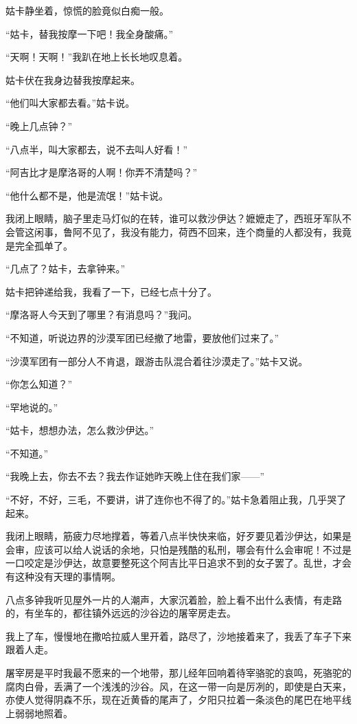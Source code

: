\par 姑卡静坐着，惊慌的脸竟似白痴一般。
\par “姑卡，替我按摩一下吧！我全身酸痛。”
\par “天啊！天啊！”我趴在地上长长地叹息着。
\par 姑卡伏在我身边替我按摩起来。
\par “他们叫大家都去看。”姑卡说。
\par “晚上几点钟？”
\par “八点半，叫大家都去，说不去叫人好看！”
\par “阿吉比才是摩洛哥的人啊！你弄不清楚吗？”
\par “他什么都不是，他是流氓！”姑卡说。
\par 我闭上眼睛，脑子里走马灯似的在转，谁可以救沙伊达？嬷嬷走了，西班牙军队不会管这闲事，鲁阿不见了，我没有能力，荷西不回来，连个商量的人都没有，我竟是完全孤单了。
\par “几点了？姑卡，去拿钟来。”
\par 姑卡把钟递给我，我看了一下，已经七点十分了。
\par “摩洛哥人今天到了哪里？有消息吗？”我问。
\par “不知道，听说边界的沙漠军团已经撤了地雷，要放他们过来了。”
\par “沙漠军团有一部分人不肯退，跟游击队混合着往沙漠走了。”姑卡又说。
\par “你怎么知道？”
\par “罕地说的。”
\par “姑卡，想想办法，怎么救沙伊达。”
\par “不知道。”
\par “我晚上去，你去不去？我去作证她昨天晚上住在我们家——”
\par “不好，不好，三毛，不要讲，讲了连你也不得了的。”姑卡急着阻止我，几乎哭了起来。
\par 我闭上眼睛，筋疲力尽地撑着，等着八点半快快来临，好歹要见着沙伊达，如果是会审，应该可以给人说话的余地，只怕是残酷的私刑，哪会有什么会审呢！不过是一口咬定是沙伊达，故意要整死这个阿吉比平日追求不到的女子罢了。乱世，才会有这种没有天理的事情啊。
\par 八点多钟我听见屋外一片的人潮声，大家沉着脸，脸上看不出什么表情，有走路的，有坐车的，都往镇外远远的沙谷边的屠宰房走去。
\par 我上了车，慢慢地在撒哈拉威人里开着，路尽了，沙地接着来了，我丢了车子下来跟着人走。
\par 屠宰房是平时我最不愿来的一个地带，那儿经年回响着待宰骆驼的哀鸣，死骆驼的腐肉白骨，丢满了一个浅浅的沙谷。风，在这一带一向是厉冽的，即使是白天来，亦使人觉得阴森不乐，现在近黄昏的尾声了，夕阳只拉着一条淡色的尾巴在地平线上弱弱地照着。
